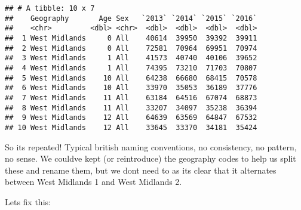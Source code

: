 \documentclass[]{article}
\newenvironment{Shaded}{\begin{snugshade}}{\end{snugshade}}
\newcommand{\KeywordTok}[1]{\textcolor[rgb]{0.13,0.29,0.53}{\textbf{#1}}}
\newcommand{\DecValTok}[1]{\textcolor[rgb]{0.00,0.00,0.81}{#1}}
\newcommand{\StringTok}[1]{\textcolor[rgb]{0.31,0.60,0.02}{#1}}
\newcommand{\CommentTok}[1]{\textcolor[rgb]{0.56,0.35,0.01}{\textit{#1}}}
\newcommand{\ControlFlowTok}[1]{\textcolor[rgb]{0.13,0.29,0.53}{\textbf{#1}}}
\newcommand{\OperatorTok}[1]{\textcolor[rgb]{0.81,0.36,0.00}{\textbf{#1}}}
\newcommand{\NormalTok}[1]{#1}
\begin{document}
\begin{verbatim}
## # A tibble: 10 x 7
##    Geography       Age Sex   `2013` `2014` `2015` `2016`
##    <chr>         <dbl> <chr>  <dbl>  <dbl>  <dbl>  <dbl>
##  1 West Midlands     0 All    40614  39950  39392  39911
##  2 West Midlands     0 All    72581  70964  69951  70974
##  3 West Midlands     1 All    41573  40740  40106  39652
##  4 West Midlands     1 All    74395  73210  71703  70807
##  5 West Midlands    10 All    64238  66680  68415  70578
##  6 West Midlands    10 All    33970  35053  36189  37776
##  7 West Midlands    11 All    63184  64516  67074  68873
##  8 West Midlands    11 All    33207  34097  35238  36394
##  9 West Midlands    12 All    64639  63569  64847  67532
## 10 West Midlands    12 All    33645  33370  34181  35424
\end{verbatim}

So its repeated! Typical british naming conventions, no consistency, no
pattern, no sense. We couldve kept (or reintroduce) the geography codes
to help us split these and rename them, but we dont need to as its clear
that it alternates between West Midlands 1 and West Midlands 2.

Lets fix this:

\begin{Shaded}
\end{Shaded}
\end{document}
